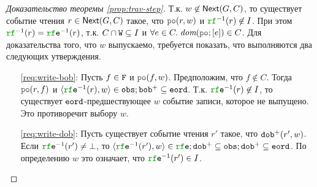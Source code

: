 \begin{proof}[Доказательство теоремы \ref{prop:trav-step}]
  Т.к. $w \not\in {\sf Next}(G, C)$, то существует событие чтения $r \in {\sf Next}(G, C)$ такое, что $\lPO(r, w)$
  и $\lRF^{-1}(r) \nin \IssuedSet$. При этом $\lRF^{-1}(r) = \lRFE^{-1}(r)$, т.к.
  $C \cap {\mathtt{W}} \subseteq I$ и $\forall e \in C. \; \dom{\lPO; [e]} \in C$.
  Для доказательства того, что $w$ выпускаемо, требуется  показать, что выполняются два следующих утверждения.
  \begin{itemize}
    \item[\ref{req:write-bob}:] Пусть $f \in {\mathtt{F}}$ и $\lPO(f, w)$.
      Предположим, что $f \nin C$. Тогда $\lPO(r, f)$ и $\tup{\lRFE^{-1}{(r)}, w} \in \lOBS; \lBOB^{+} \suq \lEORD$.
      Т.к. $\lRFE^{-1}(r) \nin \IssuedSet$, то существует ${\mathtt{eord}}$-предшествующее $w$ событие записи, которое не выпущено.
      Это противоречит выбору $w$.
    \item[\ref{req:write-dob}:] Пусть существует событие чтения $r'$ такое, что ${\mathtt{dob}}^{+}(r', w)$.
      Если $\lRFE^{-1}(r') \neq \bot$, то
      $\tup{\lRFE^{-1}(r'), w} \in \lRFE; \lDOB^{+} \suq \lOBS; \lDOB^{+} \suq \lEORD$. По определению $w$ это означает,
      что $\lRFE^{-1}(r') \in \IssuedSet$.
\qedhere
\end{itemize}  
\end{proof}

